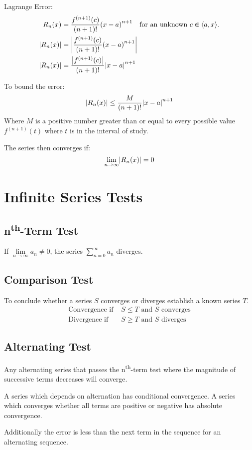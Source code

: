 \documentclass[12pt]{article}
\DeclarePairedDelimiter\abs{\lvert}{\rvert}
\newcommand*{\isum}[1]{\sum\limits_{#1}^\infty}
\newenvironment{fixbskip}{\setlength{\belowdisplayskip}{0pt}\ignorespaces}%
  {\ignorespacesafterend}
\begin{document}
Lagrange Error:
\begin{align*}
  R_n(x) &= \frac{f^{(n+1)}(c)}{(n+1)!}{(x-a)}^{n+1}
    \quad\text{for an unknown \(c \in \left<a,x\right>\).}\\
  \abs*{R_n(x)} &= \abs*{\frac{f^{(n+1)}(c)}{(n+1)!}{(x-a)}^{n+1}}\\
  \abs*{R_n(x)} &= \frac{\abs*{f^{(n+1)}(c)}}{(n+1)!}\abs*{x-a}^{n+1}
\end{align*}


To bound the error:
\[
  \abs*{R_n(x)} \le \frac{M}{(n+1)!}\abs*{x-a}^{n+1}
\]
Where \(M\) is a positive number greater than or equal to every possible value
\(f^{(n+1)}(t)\) where \(t\) is in the interval of study.

The series then converges if:
\[
  \lim_{n \to \infty} \abs*{R_n(x)} = 0
\]
\section*{Infinite Series Tests}
\subsection*{n\textsuperscript{th}-Term Test}
If \(\lim\limits_{n \to \infty} a_n \ne 0\), the series
\(\isum{n=0}a_n\) diverges.
\subsection*{Comparison Test}
To conclude whether a series \(S\) converges or diverges establish a known
series \(T\).
\begin{fixbskip}
  \begin{align*}
    \text{Convergence if } &S \le T \text{ and } S \text { converges}\\
    \text{Divergence if } &S \ge T \text{ and } S \text { diverges}
  \end{align*}
\end{fixbskip}
\subsection*{Alternating Test}
Any alternating series that passes the n\textsuperscript{th}-term test where
the magnitude of successive terms decreases will converge.

A series which depends on alternation has conditional convergence. A series
which converges whether all terms are positive or negative has absolute
convergence.

Additionally the error is less than the next term in the sequence for an
alternating sequence.
\end{document}
